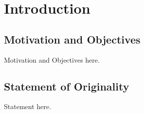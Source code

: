 
\chapter{Introduction}

\section{Motivation and Objectives}

Motivation and Objectives here.


\section{Statement of Originality}

Statement here.

